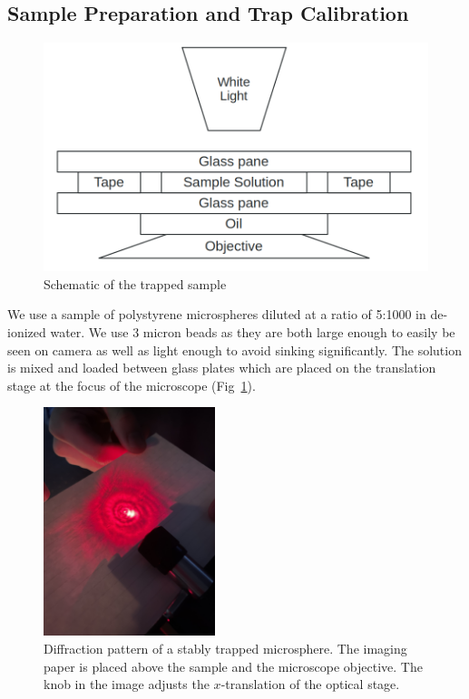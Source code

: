 \documentclass[aps,prb,twocolumn,superscriptaddress,floatfix,longbibliography,citeautoscript]{revtex4-2}
\begin{document}
\subsection{Sample Preparation and Trap Calibration}
\begin{figure}[H]
    \centering
    \includegraphics[width=1\linewidth]{./figs/sample_figure.png}
    \caption{Schematic of the trapped sample}
    \label{fig:sample}
\end{figure}
We use a sample of polystyrene microspheres diluted at a ratio of 5:1000 in de-ionized water. We use 3 micron beads as they are both large enough to easily be seen on camera as well as light enough to avoid sinking significantly. The solution is mixed and loaded between glass plates which are placed on the translation stage at the focus of the microscope (Fig~\ref{fig:sample}). 
\begin{figure}
    \centering
    \includegraphics[width=5cm]{figs/diffraction.jpg}
    \caption{Diffraction pattern of a stably trapped microsphere. The imaging paper is placed above the sample and the microscope objective. The knob in the image adjusts the $x$-translation of the optical stage.}
    \label{fig:trapDiffractionPattern}
\end{figure}
\end{document}
